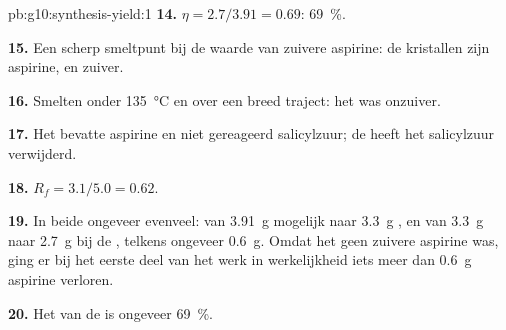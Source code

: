 \begin{solution}{pb:g10:synthesis-yield:1}
\textbf{14.} $\eta = 2.7 / 3.91 = 0.69$: \qty{69}{\percent}.

\textbf{15.} Een scherp smeltpunt bij de waarde van zuivere aspirine: de
kristallen zijn aspirine, en zuiver.

\textbf{16.} Smelten onder \qty{135}{\celsius} en over een breed traject:
het  was onzuiver.

\textbf{17.} Het  bevatte aspirine en niet gereageerd
salicylzuur; de  heeft het salicylzuur verwijderd.

\textbf{18.} $R_f = 3.1 / 5.0 = 0.62$.

\textbf{19.} In beide ongeveer evenveel: van \qty{3.91}{g} mogelijk naar
\qty{3.3}{g} , en van \qty{3.3}{g} naar \qty{2.7}{g} bij de
, telkens ongeveer \qty{0.6}{g}. Omdat het 
geen zuivere aspirine was, ging er bij het eerste deel van het werk in
werkelijkheid iets meer dan \qty{0.6}{g} aspirine verloren.

\textbf{20.} Het  van de  is ongeveer \qty{69}{\percent}.
\end{solution}
